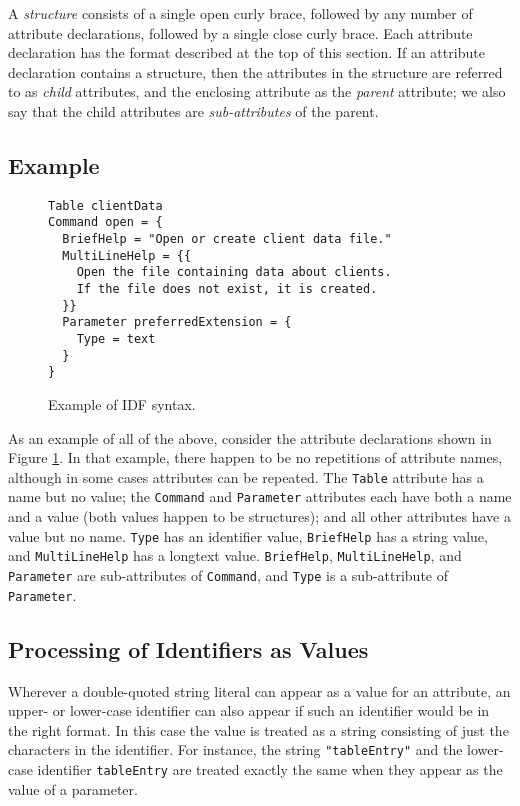 \documentclass[11pt]{article}
\begin{document}
A {\it structure} consists of a single open curly brace,
followed by any number of attribute declarations, followed
by a single close curly brace.  Each attribute declaration
has the format described at the top of this section.
If an attribute declaration contains a structure, then
the attributes in the structure are referred to as
{\it child} attributes, and the enclosing attribute as the
{\it parent} attribute; we also say that the child attributes
are {\it sub-attributes} of the parent.

\subsection{Example}

\begin{figure}
\begin{verbatim}
Table clientData
Command open = {
  BriefHelp = "Open or create client data file."
  MultiLineHelp = {{
    Open the file containing data about clients.
    If the file does not exist, it is created.
  }}
  Parameter preferredExtension = {
    Type = text
  }
}
\end{verbatim}
\caption{
  Example of IDF syntax.
}
\label{idf-example-fig}
\end{figure}

As an example of all of the above, consider the attribute declarations
shown in Figure \ref{idf-example-fig}.
In that example, there happen to be no repetitions of
attribute names, although in some cases attributes can be
repeated.  The {\tt Table} attribute has a name but no value;
the {\tt Command} and {\tt Parameter} attributes each have both
a name and a value (both values happen to be structures); and
all other attributes have a value but no name.  {\tt Type} has
an identifier value, {\tt BriefHelp} has a string value, and
{\tt MultiLineHelp} has a longtext value.  {\tt BriefHelp},
{\tt MultiLineHelp}, and {\tt Parameter} are sub-attributes of
{\tt Command}, and {\tt Type} is a
sub-attribute of {\tt Parameter}.

\subsection{Processing of Identifiers as Values}

Wherever a double-quoted string literal can appear as a value
for an attribute, an upper- or lower-case identifier can also
appear if such an identifier would be in the right format.
In this case the value is treated as a string
consisting of just the characters in the identifier.  For
instance, the string \verb/"tableEntry"/ and the lower-case
identifier \verb/tableEntry/ are treated exactly the same
when they appear as the value of a parameter.
\end{document}
